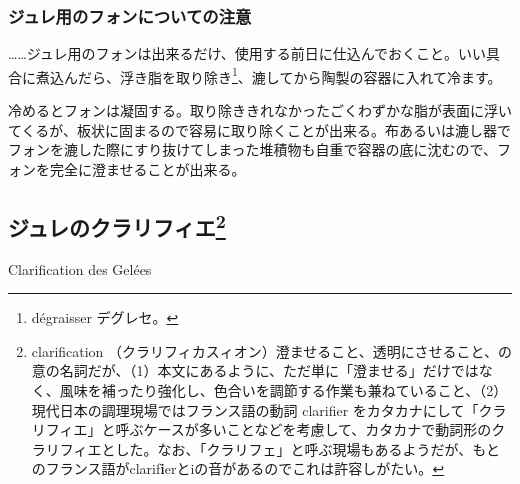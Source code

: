 \begin{recette}
{\subsubsection{ジュレ用のフォンについての注意}\label{observation-sur-l-emplois-des-fonds-destines-aux-gelees}}

\ldots{}\ldots{}ジュレ用のフォンは出来るだけ、使用する前日に仕込んでおくこと。いい具合に煮込んだら、浮き脂を取り除き\footnote{dégraisser
  デグレセ。}、漉してから陶製の容器に入れて冷ます。

冷めるとフォンは凝固する。取り除ききれなかったごくわずかな脂が表面に浮いてくるが、板状に固まるので容易に取り除くことが出来る。布あるいは漉し器でフォンを漉した際にすり抜けてしまった堆積物も自重で容器の底に沈むので、フォンを完全に澄ませることが出来る。

\end{recette}

\newpage

\begin{main}

\hypertarget{clarfication-des-gelees}{%
\subsection[ジュレのクラリフィエ]{\texorpdfstring{ジュレのクラリフィエ\footnote{clarification
  （クラリフィカスィオン）澄ませること、透明にさせること、の意の名詞だが、（1）本文にあるように、ただ単に「澄ませる」だけではなく、風味を補ったり強化し、色合いを調節する作業も兼ねていること、（2）現代日本の調理現場ではフランス語の動詞
  clarifier
  をカタカナにして「クラリフィエ」と呼ぶケースが多いことなどを考慮して、カタカナで動詞形のクラリフィエとした。なお、「クラリフェ」と呼ぶ現場もあるようだが、もとのフランス語がclarif\textbf{i}erとiの音があるのでこれは許容しがたい。}}{ジュレのクラリフィエ}}\label{clarfication-des-gelees}}

\begin{frsecbenv}

Clarification des Gelées

\end{frsecbenv}


\end{main}

